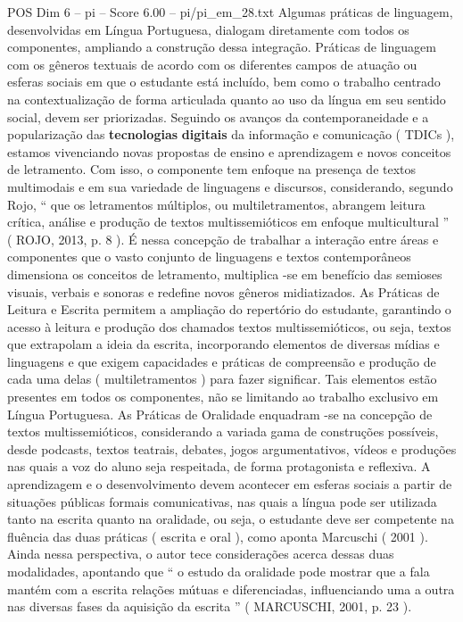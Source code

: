 \begin{textsample}{POS Dim 6 – pi – Score 6.00 – pi/pi\_em\_28.txt}
Algumas práticas de linguagem, desenvolvidas em Língua Portuguesa, dialogam diretamente com todos os componentes, ampliando a construção dessa integração.
Práticas de linguagem com os gêneros textuais de acordo com os diferentes campos de atuação ou esferas sociais em que o estudante está incluído, bem como o trabalho centrado na contextualização de forma articulada quanto ao uso da língua em seu sentido social, devem ser priorizadas.
Seguindo os avanços da contemporaneidade e a popularização das \textbf{tecnologias} \textbf{digitais} da informação e comunicação ( TDICs ), estamos vivenciando novas propostas de ensino e aprendizagem e novos conceitos de letramento.
Com isso, o componente tem enfoque na presença de textos multimodais e em sua variedade de linguagens e discursos, considerando, segundo Rojo, “ que os letramentos múltiplos, ou multiletramentos, abrangem leitura crítica, análise e produção de textos multissemióticos em enfoque multicultural ” ( ROJO, 2013, p. 8 ).
É nessa concepção de trabalhar a interação entre áreas e componentes que o vasto conjunto de linguagens e textos contemporâneos dimensiona os conceitos de letramento, multiplica -se em benefício das semioses visuais, verbais e sonoras e redefine novos gêneros midiatizados.
As Práticas de Leitura e Escrita permitem a ampliação do repertório do estudante, garantindo o acesso à leitura e produção dos chamados textos multissemióticos, ou seja, textos que extrapolam a ideia da escrita, incorporando elementos de diversas mídias e linguagens e que exigem capacidades e práticas de compreensão e produção de cada uma delas ( multiletramentos ) para fazer significar.
Tais elementos estão presentes em todos os componentes, não se limitando ao trabalho exclusivo em Língua Portuguesa.
As Práticas de Oralidade enquadram -se na concepção de textos multissemióticos, considerando a variada gama de construções possíveis, desde podcasts, textos teatrais, debates, jogos argumentativos, vídeos e produções nas quais a voz do aluno seja respeitada, de forma protagonista e reflexiva.
A aprendizagem e o desenvolvimento devem acontecer em esferas sociais a partir de situações públicas formais comunicativas, nas quais a língua pode ser utilizada tanto na escrita quanto na oralidade, ou seja, o estudante deve ser competente na fluência das duas práticas ( escrita e oral ), como aponta Marcuschi ( 2001 ).
Ainda nessa perspectiva, o autor tece considerações acerca dessas duas modalidades, apontando que “ o estudo da oralidade pode mostrar que a fala mantém com a escrita relações mútuas e diferenciadas, influenciando uma a outra nas diversas fases da aquisição da escrita ” ( MARCUSCHI, 2001, p. 23 ).

\end{textsample}
